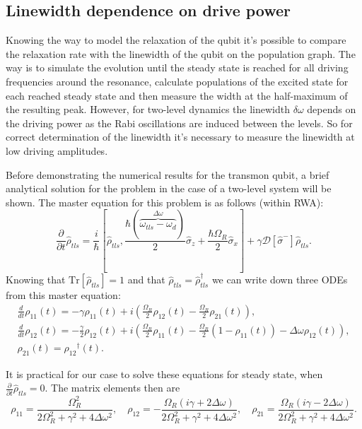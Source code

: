 \documentclass[12pt, twoside]{report}
\numberwithin{equation}{section}
\begin{document}
\subsection{Linewidth dependence on drive power} \label{subsec:linewidth}

Knowing the way to model the relaxation of the qubit it's possible to compare the relaxation rate with the linewidth of the qubit on the population graph. The way is to simulate the evolution until the steady state is reached for all driving frequencies around the resonance, calculate populations of the excited state for each reached steady state and then measure the width at the half-maximum of the resulting peak. However, for two-level dynamics the linewidth $\delta \omega$ depends on the driving power as the Rabi oscillations are induced between the levels. So for correct determination of the linewidth it's necessary to measure the linewidth at low driving amplitudes.

Before demonstrating the numerical results for the transmon qubit, a brief analytical solution for the problem in the case of a two-level system will be shown. The master equation for this problem is as follows (within RWA):
\[
\frac{\partial}{\partial t} \hat{\rho}_{tls} = \frac{i}{\hbar}[\hat{\rho}_{tls}, \frac{\hbar (\overbrace{\omega_{tls}-\omega_d}^{\Delta\omega})}{2} \hat{\sigma}_z+\frac{\hbar \Omega_R}{2} \hat{\sigma}_x] + \gamma \mathcal{D}[\hat \sigma^-]\hat\rho_{tls}.
\]
Knowing that $\text{Tr}[\hat\rho_{tls}]=1$ and that $\hat\rho_{tls}=\hat\rho_{tls}^\dag$ we can write down three ODEs from this master equation:
\[
\begin{gathered}
\frac{d}{d t} {ρ_{11}}{\left (t \right )} = - γ {ρ_{11}}{\left (t \right )} + i \left(\frac{Ω_{R}}{2} {ρ_{12}}{\left (t \right )} - \frac{Ω_{R}}{2} {ρ_{21}}{\left (t \right )}\right), \\
\frac{d}{d t} {ρ_{12}}{\left (t \right )} = - \frac{γ}{2} {ρ_{12}}{\left (t \right )} + i \left( \frac{Ω_{R}}{2} {ρ_{11}}{\left (t \right )} - \frac{Ω_{R}}{2} \left(1- {ρ_{11}}{\left (t \right )} \right) - \Delta ω {ρ_{12}}{\left (t \right )}\right),\\
{ρ_{21}}{\left (t \right )} = {ρ_{12}}^\dag{\left (t \right )}.
\end{gathered}
\]

It is practical for our case to solve these equations for steady state, when $\frac{\partial}{\partial t} \hat{\rho}_{tls} = 0$. The matrix elements then are
\[
ρ_{11} = \frac{Ω_{R}^{2}}{2 Ω_{R}^{2} + γ^{2} + 4 \Delta ω^{2}},\quad
ρ_{12} = - \frac{Ω_{R} \left(i γ + 2 \Delta ω\right)}{2 Ω_{R}^{2} + γ^{2} + 4 \Delta ω^{2}},\quad
ρ_{21} = \frac{Ω_{R} \left(i γ - 2 \Delta ω\right)}{2 Ω_{R}^{2} + γ^{2} + 4 \Delta ω^{2}}.
\]
\end{document}
